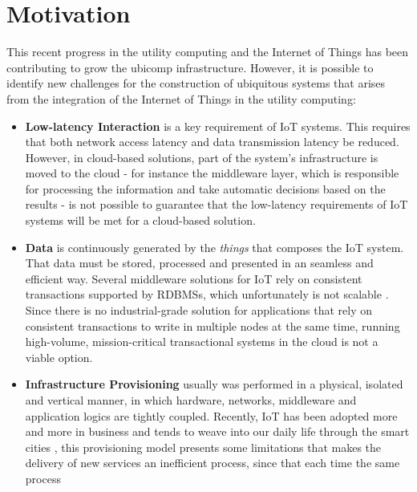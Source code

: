 \section{Motivation}
\label{section:motivation}
This recent progress in the utility computing and the Internet of Things has been contributing to grow the
\gls{ubicomp} infrastructure. However, it is possible to identify new challenges \cite{caceres2012ubicomp}
for the construction of ubiquitous systems that arises from the integration of the Internet of Things
in the utility computing:

\begin{itemize}
  \item \textbf{Low-latency Interaction} is a key requirement of \gls{IoT} systems. This requires that
  both network access latency and data transmission latency be reduced. However, in cloud-based solutions,
  part of the system's infrastructure is moved to the cloud - for instance the middleware layer,
  which is responsible for processing the information and take automatic decisions based on the results
  - is not possible to guarantee that the low-latency requirements of \gls{IoT} systems will be
  met for a cloud-based solution.
  \item \textbf{Data} is continuously generated by the \textit{things} that composes the \gls{IoT}
  system. That data must be stored, processed and presented in an seamless and efficient way. Several
  middleware solutions for \gls{IoT} \cite{floerkemeier2007rfid}\cite{eisenhauer2010hydra}\cite{de2008socrades}
  rely on consistent transactions supported by \glspl{RDBMS}, which unfortunately is not scalable
  \cite{hofmann2010cloud}. Since there is no industrial-grade solution for applications that rely on
  consistent transactions to write in multiple nodes at the same time, running high-volume, mission-critical
  transactional systems in the cloud is not a viable option.
  \item \textbf{Infrastructure Provisioning} usually was performed in a physical, isolated and vertical
  manner, in which hardware, networks, middleware and application logics are tightly coupled. Recently,
  \gls{IoT} has been adopted more and more in business and tends to weave into our daily life through the smart cities
  \cite{caragliu2011smart}\cite{schaffers2011smart}, this provisioning model presents some limitations
  that makes the delivery of new services an inefficient process, since that each time the same process

\end{itemize}
